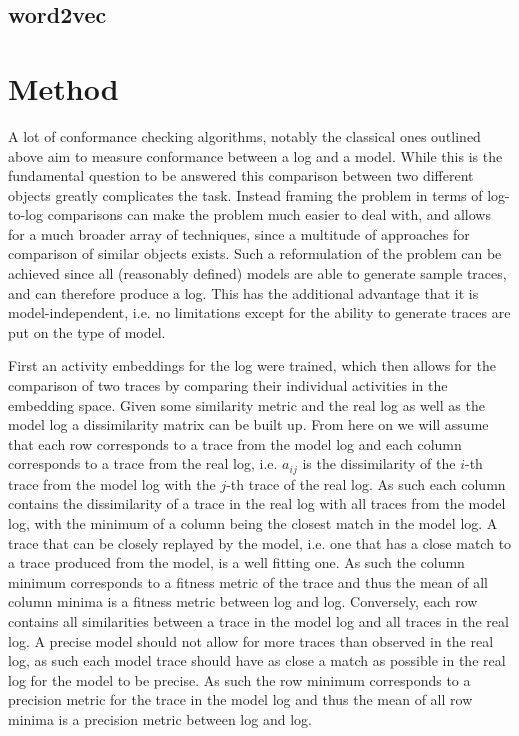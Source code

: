 \documentclass[runningheads]{template/llncs}
\begin{document}
\subsection{word2vec}

\section{Method}

A lot of conformance checking algorithms, notably the classical ones outlined above aim to measure conformance between a log and a model.
While this is the fundamental question to be answered this comparison between two different objects greatly complicates the task.
Instead framing the problem in terms of log-to-log comparisons can make the problem much easier to deal with, and allows for a much broader array of techniques, since a multitude of approaches for comparison of similar objects exists.
Such a reformulation of the problem can be achieved since all (reasonably defined) models are able to generate sample traces, and can therefore produce a log.
This has the additional advantage that it is model-independent, i.e. no limitations except for the ability to generate traces are put on the type of model.

First an activity embeddings for the log were trained, which then allows for the comparison of two traces by comparing their individual activities in the embedding space.
Given some similarity metric and the real log as well as the model log a dissimilarity matrix can be built up.
From here on we will assume that each row corresponds to a trace from the model log and each column corresponds to a trace from the real log, i.e. $a_{ij}$ is the dissimilarity of the $i$-th trace from the model log with the $j$-th trace of the real log.
As such each column contains the dissimilarity of a trace in the real log with all traces from the model log, with the minimum of a column being the closest match in the model log.
A trace that can be closely replayed by the model, i.e. one that has a close match to a trace produced from the model, is a well fitting one.
As such the column minimum corresponds to a fitness metric of the trace and thus the mean of all column minima is a fitness metric between log and log.
Conversely, each row contains all similarities between a trace in the model log and all traces in the real log.
A precise model should not allow for more traces than observed in the real log, as such each model trace should have as close a match as possible in the real log for the model to be precise.
As such the row minimum corresponds to a precision metric for the trace in the model log and thus the mean of all row minima is a precision metric between log and log.
\end{document}
